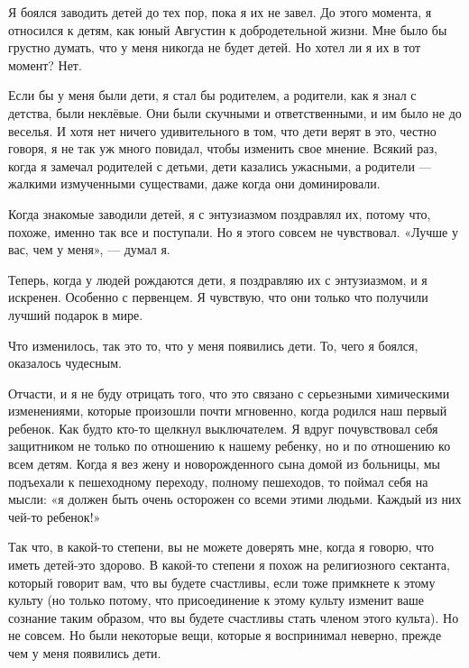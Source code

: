 \documentclass[ebook,12pt,oneside,openany]{memoir}
\begin{document}
\maketitle

Я боялся заводить детей до тех пор, пока я их не завел. До этого
момента, я относился к детям, как юный Августин к добродетельной
жизни. Мне было бы грустно думать, что у меня никогда не будет детей.
Но хотел ли я их в тот момент? Нет.

Если бы у меня были дети, я стал бы родителем, а родители, как я знал
с детства, были неклёвые. Они были скучными и ответственными, и им
было не до веселья. И хотя нет ничего удивительного в том, что дети
верят в это, честно говоря, я не так уж много повидал, чтобы изменить
свое мнение. Всякий раз, когда я замечал родителей с детьми, дети
казались ужасными, а родители — жалкими измученными существами, даже
когда они доминировали.

Когда знакомые заводили детей, я с энтузиазмом поздравлял их, потому
что, похоже, именно так все и поступали. Но я этого совсем не
чувствовал. «Лучше у вас, чем у меня», — думал я.

Теперь, когда у людей рождаются дети, я поздравляю их с энтузиазмом, и
я искренен. Особенно с первенцем. Я чувствую, что они только что
получили лучший подарок в мире.

Что изменилось, так это то, что у меня появились дети. То, чего я
боялся, оказалось чудесным.

Отчасти, и я не буду отрицать того, что это связано с серьезными
химическими изменениями, которые произошли почти мгновенно, когда
родился наш первый ребенок. Как будто кто-то щелкнул выключателем. Я
вдруг почувствовал себя защитником не только по отношению к нашему
ребенку, но и по отношению ко всем детям. Когда я вез жену и
новорожденного сына домой из больницы, мы подъехали к пешеходному
переходу, полному пешеходов, то поймал себя на мысли: «я должен быть
очень осторожен со всеми этими людьми. Каждый из них чей-то ребенок!»

Так что, в какой-то степени, вы не можете доверять мне, когда я
говорю, что иметь детей-это здорово. В какой-то степени я похож на
религиозного сектанта, который говорит вам, что вы будете счастливы,
если тоже примкнете к этому культу (но только потому, что
присоединение к этому культу изменит ваше сознание таким образом, что
вы будете счастливы стать членом этого культа). Но не совсем. Но были
некоторые вещи, которые я воспринимал неверно, прежде чем у меня
появились дети.
\end{document}
